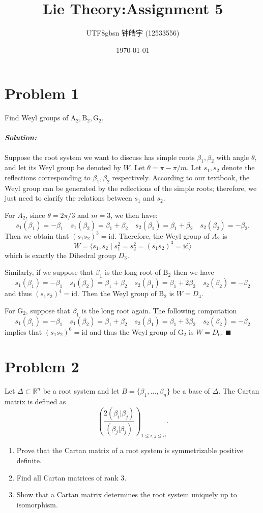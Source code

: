 \documentclass[12pt, a4paper]{article}
\title{Lie Theory:Assignment 5}
\author{
    \begin{CJK*}{UTF8}{gbsn}
    钟皓宇 (12533556)
    \end{CJK*}
}
\date{\today}
\newenvironment{solution}
  {\paragraph{\textit{Solution:}}\par\medskip}
  {\hfill$\blacksquare$\vspace{0.1cm}}
\begin{document}
\maketitle




\section*{Problem 1}
Find Weyl groups of $\mathrm{A}_2, \mathrm{B}_2, \mathrm{G}_2$.
\begin{solution}
  Suppose the root system we want to discuss has simple roots $\beta_1, \beta_2$ with angle $\theta$, and let its Weyl group be denoted by $W$. Let $\theta = \pi - \pi/m$.
  Let $s_1, s_2$ denote the reflections corresponding to $\beta_1, \beta_2$ respectively. 
  According to our textbook, the Weyl group can be generated by the reflections of the simple roots; therefore, we just need to clarify the relations between $s_1$ and $s_2$.
  
  For $A_2$, since $\theta = 2\pi/3$ and $m = 3$, we then have:$$s_1(\beta_1) = -\beta_1 \quad s_1(\beta_2) = \beta_1 + \beta_2 \quad s_2(\beta_1) = \beta_1 + \beta_2 \quad s_2(\beta_2) = -\beta_2.$$
  Then we obtain that $(s_1s_2)^3 = \text{id}$. Therefore, the Weyl group of $A_2$ is$$W = \langle s_1, s_2 \mid s_1^2 = s_2^2 = (s_1s_2)^3 = \text{id} \rangle$$
  which is exactly the Dihedral group $D_3$.

  Similarly, if we suppose that $\beta_1$ is the long root of $\mathrm{B}_2$ then we have 
  $$s_1(\beta_1) = -\beta_1 \quad s_1(\beta_2) = \beta_1 + \beta_2 \quad s_2(\beta_1) = \beta_1 + 2\beta_2 \quad s_2(\beta_2) = -\beta_2$$
  and thus $(s_1s_2)^{4}=\text{id}$. Then the Weyl group of $\mathrm{B}_2$ is $W = D_4$.

  For $\mathrm{G}_2$, suppose that $\beta_1$ is the long root again. The following computation 
  $$s_1(\beta_1) = -\beta_1 \quad s_1(\beta_2) = \beta_1 + \beta_2 \quad s_2(\beta_1) = \beta_1 + 3\beta_2 \quad s_2(\beta_2) = -\beta_2$$
  implies that $(s_1s_2)^{6}=\text{id}$ and thus the Weyl group of $\mathrm{G}_2$ is $W = D_6$.
\end{solution}

\section*{Problem 2}
Let $\Delta \subset \mathbb{R}^n$ be a root system and let $B = \{\beta_1, \dots, \beta_n\}$ be a base of $\Delta$. The Cartan matrix is defined as
$$
\left( \frac{2(\beta_i|\beta_j)}{(\beta_j|\beta_j)} \right)_{1 \le i, j \le n}.
$$
\begin{enumerate}
  \item Prove that the Cartan matrix of a root system is symmetrizable positive definite.
  \item Find all Cartan matrices of rank 3.
  \item Show that a Cartan matrix determines the root system uniquely up to isomorphism.
\end{enumerate}
\end{document}
